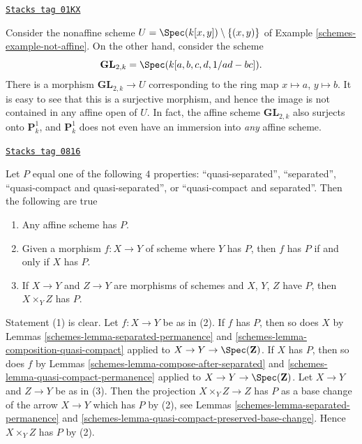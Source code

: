 \begin{example}
\label{schemes-example-image-affine-projective}
\href{https://stacks.math.columbia.edu/tag/01KX}{\texttt{Stacks tag 01KX}}

Consider the nonaffine scheme
$U = \Spec(k[x, y]) \setminus \{(x, y)\}$ of
Example \ref{schemes-example-not-affine}. On the other hand, consider the
scheme
$$
\mathbf{GL}_{2, k} = \Spec(k[a, b, c, d, 1/ad - bc]).
$$
There is a morphism $\mathbf{GL}_{2, k} \to U$ corresponding
to the ring map $x \mapsto a$, $y \mapsto b$. It is easy to see that
this is a surjective morphism, and hence the image is not contained
in any affine open of $U$. In fact, the affine scheme
$\mathbf{GL}_{2, k}$ also surjects onto $\mathbf{P}^1_k$, and
$\mathbf{P}^1_k$ does not even have an immersion into {\it any} affine scheme.
\end{example}

\begin{remark}
\label{schemes-remark-quasi-compact-and-quasi-separated}
\href{https://stacks.math.columbia.edu/tag/0816}{\texttt{Stacks tag 0816}}

Let $P$ equal one of the following $4$ properties:
``quasi-separated'', ``separated'',
``quasi-compact and quasi-separated'', or ``quasi-compact and separated''.
Then the following are true
\begin{enumerate}
\item Any affine scheme has $P$.
\item Given a morphism $f : X \to Y$ of scheme where $Y$ has $P$, then
$f$ has $P$ if and only if $X$ has $P$.
\item If  $X \to Y$ and $Z \to Y$ are morphisms of schemes
and $X$, $Y$, $Z$ have $P$, then $X \times_Y Z$ has $P$.
\end{enumerate}
Statement (1) is clear.
Let $f : X \to Y$ be as in (2). If $f$ has $P$, then so does $X$
by Lemmas \ref{schemes-lemma-separated-permanence} and
\ref{schemes-lemma-composition-quasi-compact} applied to
$X \to Y \to \Spec(\mathbf{Z})$. If $X$ has $P$, then so does $f$ by
Lemmas \ref{schemes-lemma-compose-after-separated} and
\ref{schemes-lemma-quasi-compact-permanence} applied to
$X \to Y \to \Spec(\mathbf{Z})$.
Let $X \to Y$ and $Z \to Y$ be as in (3).
Then the projection $X \times_Y Z \to Z$ has $P$ as a base change of
the arrow $X \to Y$ which has $P$ by (2), see Lemmas
\ref{schemes-lemma-separated-permanence} and
\ref{schemes-lemma-quasi-compact-preserved-base-change}.
Hence $X \times_Y Z$ has $P$ by (2).
\end{remark}

